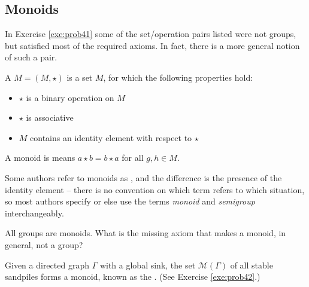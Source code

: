 \documentclass[../UNABRIDGEDalgebraNotesMSRI-UP2016.tex]{subfiles}
\begin{document}
\subsection[\subsecname]{Monoids}\label{subsec:monoids}
\begin{frame}{\subsecname}
In Exercise \ref{exe:prob41} some of the set/operation pairs listed were not groups, but satisfied most of the required axioms.  In fact, there is a more general notion of such a pair.

\smallGap
\begin{dfn}
A  $M=(M,\star)$ is a set $M$, for which the following properties hold:
\begin{itemize}
\item $\star$ is a binary operation on $M$
\item $\star$ is associative
\item $M$ contains an identity element with respect to $\star$
\end{itemize}

\smallGap
A monoid is  means $a\star b=b\star a$ for all $g,h\in M$.
\end{dfn}
\end{frame}

\begin{frame}%
Some authors refer to monoids as , and the difference is the presence of the identity element -- there is no convention on which term refers to which situation, so most authors specify or else use the terms \emph{monoid} and \emph{semigroup} interchangeably.

\smallGap
\begin{que}
All groups are monoids.  What is the missing axiom that makes a monoid, in general, not a group?
\end{que}

\smallGap
\begin{ex}
Given a directed graph $\Gamma$ with a global sink, the set $\mathscr M(\Gamma)$ of all stable sandpiles forms a monoid, known as the .  (See Exercise \ref{exe:prob42}.)
\end{ex}
\end{frame}
\end{document}
